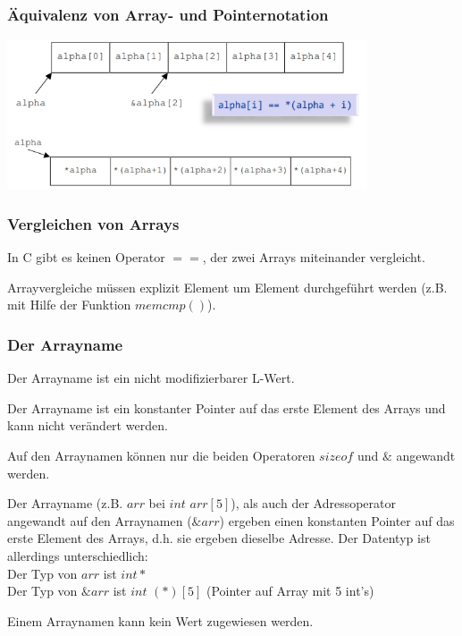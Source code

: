 		\begin{minipage}[t]{9 cm}
			\subsubsection{Äquivalenz von Array- und Pointernotation }	
				\includegraphics[width=0.8\textwidth]{pics/array_pointer.jpg}
				
			\subsubsection{Vergleichen von Arrays }
			\begin{compactitem}
				\item In C gibt es keinen Operator $==$, der zwei Arrays miteinander vergleicht.
				\item Arrayvergleiche müssen explizit Element um Element durchgeführt werden (z.B. mit Hilfe der Funktion $memcmp()$).
			\end{compactitem}
		\end{minipage}
		\hspace*{0.5cm}
		\begin{minipage}[t]{9 cm}	
			\subsubsection{Der Arrayname }
				\begin{compactitem}
					\item Der Arrayname ist ein nicht modifizierbarer L-Wert.
					\item Der Arrayname ist ein konstanter Pointer auf das erste Element des Arrays und kann nicht verändert werden.
					\item Auf den Arraynamen können nur die beiden Operatoren $sizeof$ und $\&$ angewandt werden.
					\item Der Arrayname (z.B. $arr$ bei $int$ $arr[5]$), als auch der Adressoperator angewandt auf den Arraynamen ($\&arr$) ergeben einen konstanten Pointer auf das erste Element des Arrays, d.h. sie ergeben dieselbe Adresse. Der Datentyp ist allerdings unterschiedlich: \\
					Der Typ von $arr$ ist $int*$ \\
					Der Typ von $\&arr$ ist $int$ $(*)[5]$ (Pointer auf Array mit 5 int's)
					\item Einem Arraynamen kann kein Wert zugewiesen werden.
				\end{compactitem}
		\end{minipage}
		
